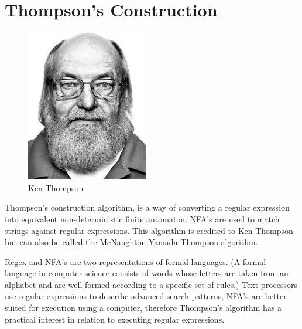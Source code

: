 \documentclass[12pt]{article}
\begin{document}
\newpage
\section{Thompson's Construction}
\begin{figure}[h!]
\centering
\includegraphics[scale=0.7]{Photos/kenthompson.jpg}
\caption{Ken Thompson}
\label{fig:nfa}
\end{figure}
\cite{wikipedia}
Thompson's construction algorithm, is a way of converting a regular expression into equivalent non-deterministic finite automaton. NFA's are used to match strings against regular expressions. This algorithm is credited to Ken Thompson but can also be called the McNaughton-Yamada-Thompson algorithm.

Regex and NFA's are two representations of formal languages. (A formal language in computer science consists of words whose letters are taken from an alphabet and are well formed according to a specific set of rules.) Text processors use regular expressions to describe advanced search patterns, NFA's are better suited for execution using a computer, therefore Thompson's algorithm has a practical interest in relation to executing regular expressions.
\newpage
\end{document}
